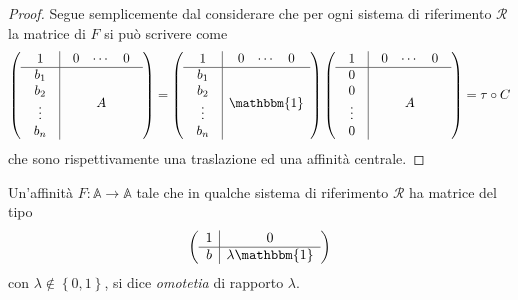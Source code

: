 \documentclass[11pt]{scrartcl}
\renewcommand{\AA}{\mathbb{A}}
\begin{document}
   	 \begin{proof}
   	 	Segue semplicemente dal considerare che per ogni sistema di riferimento $\mathcal{R}$ la matrice di $F$ si può scrivere come
   	 	$$\left(\begin{array}{c|c}
   	 		1 & \begin{array}{ccc}
   	 			0 & \cdots & 0 
   	 		\end{array} \\
   	 		\hline
   	 		\begin{array}{c}
   	 			b_1 \\
   	 			b_2 \\
   	 			\vdots \\
   	 			b_n
   	 		\end{array} & A
   	 	\end{array}\right)=
   	 	\left(\begin{array}{c|c}
   	 		1 & \begin{array}{ccc}
   	 			0 & \cdots & 0 
   	 		\end{array} \\
   	 		\hline
   	 		\begin{array}{c}
   	 			b_1 \\
   	 			b_2 \\
   	 			\vdots \\
   	 			b_n
   	 		\end{array} & \mathbbm{1}
   	 	\end{array}\right)
   	 	\left(\begin{array}{c|c}
   	 		1 & \begin{array}{ccc}
   	 			0 & \cdots & 0 
   	 		\end{array} \\
   	 		\hline
   	 		\begin{array}{c}
   	 			0 \\
   	 			0 \\
   	 			\vdots \\
   	 			0
   	 		\end{array} & A
   	 	\end{array}\right)=\tau\circ C
   	 	$$
   	 	che sono rispettivamente una traslazione ed una affinità centrale.
   	 \end{proof}
   	 \begin{definition}[Omotetia]
   	 	Un'affinità $F:\AA\to\AA$ tale che in qualche sistema di riferimento $\mathcal{R}$ ha matrice del tipo
   	 	$$\left(\begin{array}{c|c}
   	 		1 & 0 \\
   	 		\hline
   	 		b & \lambda \mathbbm{1}
   	 	\end{array}\right)$$
   	 	con $\lambda\not\in\left\{0,1\right\}$, si dice \textit{omotetia} di rapporto $\lambda$.
   	 \end{definition}
\end{document}
